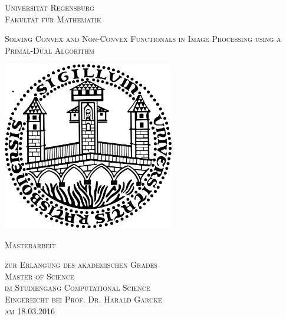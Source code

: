 \documentclass[abstracton]{scrreprt}
\begin{document}

\begin{titlepage} %
    \begin{center}
        \begin{large}
            \textsc{Universit\"at Regensburg\\
                Fakult\"at f\"ur Mathematik\\
            }
        \end{large}
        \vspace{0.5cm}
        \begin{huge}
            \begin{spacing}{0.9}
            \textsc{Solving Convex and Non-Convex Functionals in Image Processing using a Primal-Dual Algorithm}
            \end{spacing}
        \end{huge}
        \vspace{1.2cm}
        \begin{center}
        \includegraphics[width=7.5cm]{img/sigillum.png}
        \vspace{1.0cm}\\
        \begin{Large}
            \textsc{Masterarbeit}\\
        \end{Large}
        \vspace{0.5cm}
        \begin{large}
            \textsc{zur Erlangung des akademischen Grades\\
                Master of Science\\
                im Studiengang Computational Science\\
                \vspace{0.5cm}
                Eingereicht bei Prof. Dr. Harald Garcke\\
                am 18.03.2016\\
            }
        \end{large}
        \vspace{1.0cm}
    \end{center}


\end{center}
\end{titlepage}
\end{document}
